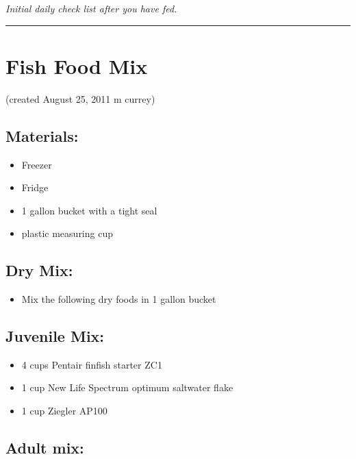 \documentclass[
]{book}
\providecommand{\tightlist}{%
  \setlength{\itemsep}{0pt}\setlength{\parskip}{0pt}}
\begin{document}
\emph{Initial daily check list after you have fed. }

\begin{center}\rule{0.5\linewidth}{0.5pt}\end{center}

\hypertarget{fish-food-mix}{%
\section{Fish Food Mix}\label{fish-food-mix}}

(created August 25, 2011 m currey)

\hypertarget{materials-1}{%
\subsection{Materials:}\label{materials-1}}

\begin{itemize}
\tightlist
\item
  Freezer
\item
  Fridge
\item
  1 gallon bucket with a tight seal
\item
  plastic measuring cup
\end{itemize}

\hypertarget{dry-mix}{%
\subsection{Dry Mix:}\label{dry-mix}}

\begin{itemize}
\tightlist
\item
  Mix the following dry foods in 1 gallon bucket
\end{itemize}

\hypertarget{juvenile-mix}{%
\subsection{Juvenile Mix:}\label{juvenile-mix}}

\begin{itemize}
\tightlist
\item
  4 cups Pentair finfish starter ZC1
\item
  1 cup New Life Spectrum optimum saltwater flake
\item
  1 cup Ziegler AP100
\end{itemize}

\hypertarget{adult-mix}{%
\subsection{Adult mix:}\label{adult-mix}}
\end{document}
